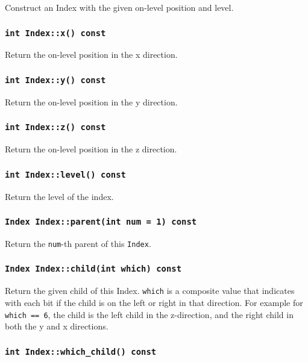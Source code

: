 Construct an Index with the given on-level position and level.

\subsubsection{\texttt{int Index::x() const}}

Return the on-level position in the x direction.

\subsubsection{\texttt{int Index::y() const}}

Return the on-level position in the y direction.

\subsubsection{\texttt{int Index::z() const}}

Return the on-level position in the z direction.

\subsubsection{\texttt{int Index::level() const}}

Return the level of the index.

\subsubsection{\texttt{Index Index::parent(int num = 1) const}}

Return the \texttt{num}-th parent of this \texttt{Index}.

\subsubsection{\texttt{Index Index::child(int which) const}}

Return the given child of this Index. \texttt{which} is a composite value
that indicates with each bit if the child is on the left or right in that
direction. For example for \texttt{which == 6}, the child is the left child
in the z-direction, and the right child in both the y and x directions.

\subsubsection{\texttt{int Index::which\_child() const}}

